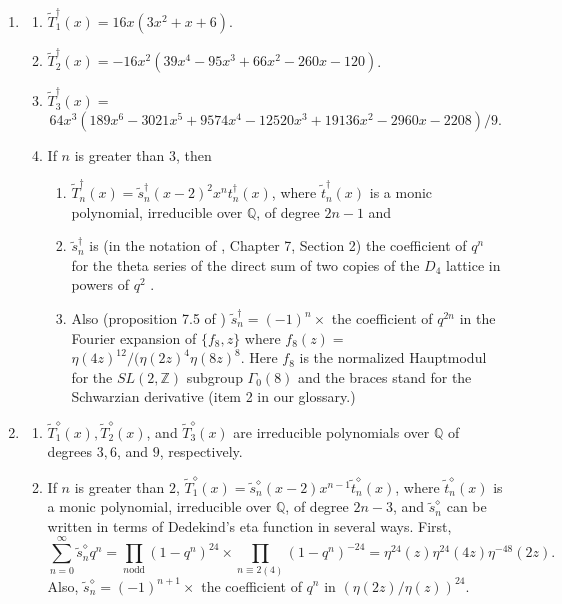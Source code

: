 \documentclass{article}
\begin{document}
\begin{conjecture}
\begin{enumerate}
\item
\begin{enumerate}
\item  $\widetilde{T}^{\dagger}_1(x) = 16x(3x^2+x+6)$.
\item $\widetilde{T}^{\dagger}_2(x) = 
-16x^2(39x^4-95x^3+66x^2-260x-120)$.
\item  $\widetilde{T}^{\dagger}_3(x) = $
$$64x^3(189x^6-3021x^5+9574x^4
-12520x^3+19136x^2-2960x-2208)/9.$$
    \item If $n$ is greater than $3$,
then \begin{enumerate}
\item $\widetilde{T}^{\dagger}_n(x) = 
\tilde{s}^{\dagger}_n
(x-2)^2 x^n t^{\dagger}_n(x)$,
where $\tilde{t}^{\dagger}_n(x)$ is 
a monic polynomial, 
irreducible
over $\mathbb{Q}$,
of degree $2n - 1$ and
\item
$\tilde{s}^{\dagger}_n$ is 
(in the notation of \cite{conway2013sphere},
 Chapter 7, Section 2) 
  the coefficient of
  $q^n$
 for the theta series of the
 direct sum of two copies of the
 $D_4$ lattice in powers of $q^2$
 \cite{OEIS5}. 
 \item Also  (proposition 7.5 of \cite{doi})
 $\tilde{s}^{\dagger}_n = 
 (-1)^n \times$  the coefficient of $q^{2n}$
 in the Fourier expansion of
 $\{f_8,z\}$ where $f_8(z) = $
 \newline
 $\eta(4z)^{12}/(\eta(2z)^4 \eta(8z)^8$.
 Here $f_8$ is the normalized Hauptmodul
 for the $SL(2,\mathbb{Z})$ subgroup
 $\Gamma_0(8)$ and the braces stand for the
 Schwarzian derivative
 (item 2 in our glossary.)
 \end{enumerate}
    \end{enumerate}
\item 
\begin{enumerate}
\item $\widetilde{T}^{\diamond}_1(x), 
\widetilde{T}^{\diamond}_2(x)$, and 
$\widetilde{T}^{\diamond}_3(x)$
are irreducible polynomials over $\mathbb{Q}$ of degrees
$3, 6$, and $9$, respectively.
\item If $n$ is greater than $2$,
$\widetilde{T}^{\diamond}_1(x) = 
\tilde{s}^{\diamond}_n(x-2)x^{n-1} \tilde{t}^{\diamond}_n(x)$, 
where $\tilde{t}^{\diamond}_n(x)$ is a monic
polynomial, irreducible 
over $\mathbb{Q}$, of degree $2n-3$,
and $\tilde{s}^{\diamond}_n$
can be written in terms of Dedekind's
eta function in several ways.
First,
$$
\sum_{n=0}^{\infty}
\tilde{s}^{\diamond}_n q^n
= \prod_{n \text{odd}}(1-q^n)^{24} \times
\prod_{n \equiv 2 (4)}(1-q^n)^{-24} = 
\eta^{24}(z) \eta^{24}(4z) \eta^{-48}(2z).
$$
Also, 
$\tilde{s}^{\diamond}_n = 
(-1)^{n+1} \times$ the coefficient 
of $q^n$ in $(\eta(2z)/\eta(z))^{24}$.
\end{enumerate}
\end{enumerate}
\end{conjecture} 
\end{document}
